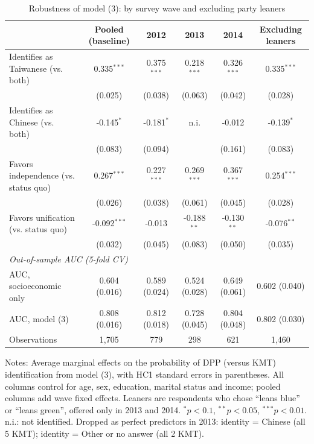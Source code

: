 \begin{table}[htbp]
\centering
\caption{Robustness of model (3): by survey wave and excluding party leaners}
\label{tab:robustness}
\small
\begin{tabular}{lccccc}
\toprule
 & Pooled (baseline) & 2012 & 2013 & 2014 & Excluding leaners \\
\midrule
Identifies as Taiwanese (vs. both) & 0.335$^{***}$ & 0.375$^{***}$ & 0.218$^{***}$ & 0.326$^{***}$ & 0.335$^{***}$ \\
 & (0.025) & (0.038) & (0.063) & (0.042) & (0.028) \\
Identifies as Chinese (vs. both) & -0.145$^{*}$ & -0.181$^{*}$ & n.i. & -0.012 & -0.139$^{*}$ \\
 & (0.083) & (0.094) &  & (0.161) & (0.083) \\
Favors independence (vs. status quo) & 0.267$^{***}$ & 0.227$^{***}$ & 0.269$^{***}$ & 0.367$^{***}$ & 0.254$^{***}$ \\
 & (0.026) & (0.038) & (0.061) & (0.045) & (0.028) \\
Favors unification (vs. status quo) & -0.092$^{***}$ & -0.013 & -0.188$^{**}$ & -0.130$^{**}$ & -0.076$^{**}$ \\
 & (0.032) & (0.045) & (0.083) & (0.050) & (0.035) \\
\midrule
\multicolumn{6}{l}{\textit{Out-of-sample AUC (5-fold CV)}} \\
AUC, socioeconomic only & 0.604 (0.016) & 0.589 (0.024) & 0.524 (0.028) & 0.649 (0.061) & 0.602 (0.040) \\
AUC, model (3) & 0.808 (0.016) & 0.812 (0.018) & 0.728 (0.045) & 0.804 (0.048) & 0.802 (0.030) \\
Observations & 1,705 & 779 & 298 & 621 & 1,460 \\
\bottomrule
\end{tabular}
\begin{minipage}{0.95\linewidth}\footnotesize
\vspace{4pt}Notes: Average marginal effects on the probability of DPP (versus KMT)
identification from model (3), with HC1 standard errors in parentheses. All columns control for
age, sex, education, marital status and income; pooled columns add wave fixed effects.
Leaners are respondents who chose ``leans blue'' or ``leans green'', offered only in 2013 and
2014. $^{*}p<0.1$, $^{**}p<0.05$, $^{***}p<0.01$.
n.i.: not identified. Dropped as perfect predictors in 2013: identity = Chinese (all 5 KMT); identity = Other or no answer (all 2 KMT).
\end{minipage}
\end{table}
